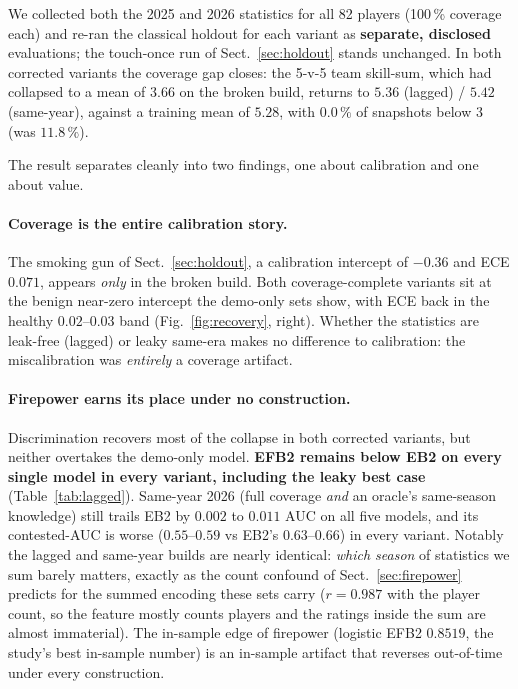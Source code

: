 \documentclass[11pt,a4paper]{article}
\begin{document}
We collected both the 2025 and 2026 statistics for all 82 players (100\,\% coverage each) and re-ran
the classical holdout for each variant as \textbf{separate, disclosed} evaluations; the touch-once run
of Sect.~\ref{sec:holdout} stands unchanged. In both corrected variants the coverage gap closes: the
5-v-5 team skill-sum, which had collapsed to a mean of $3.66$ on the broken build, returns to $5.36$
(lagged) / $5.42$ (same-year), against a training mean of $5.28$, with $0.0\,\%$ of snapshots below
$3$ (was $11.8\,\%$).

The result separates cleanly into two findings, one about calibration and one about value.

\paragraph{Coverage is the entire calibration story.}
The smoking gun of Sect.~\ref{sec:holdout}, a calibration intercept of $-0.36$ and ECE $0.071$, appears \emph{only} in the broken build. Both coverage-complete variants sit at the benign near-zero
intercept the demo-only sets show, with ECE back in the healthy $0.02$--$0.03$ band
(Fig.~\ref{fig:recovery}, right). Whether the statistics are leak-free (lagged) or leaky same-era makes
no difference to calibration: the miscalibration was \emph{entirely} a coverage artifact.

\paragraph{Firepower earns its place under no construction.}
Discrimination recovers most of the collapse in both corrected variants, but neither overtakes the
demo-only model. \textbf{EFB2 remains below EB2 on every single model in every variant, including the
leaky best case} (Table~\ref{tab:lagged}). Same-year 2026 (full coverage \emph{and} an oracle's
same-season knowledge) still trails EB2 by $0.002$ to $0.011$ AUC on all five models, and its
contested-AUC is worse ($0.55$--$0.59$ vs EB2's $0.63$--$0.66$) in every variant. Notably the lagged
and same-year builds are nearly identical: \emph{which season} of statistics we sum barely matters,
exactly as the count confound of Sect.~\ref{sec:firepower} predicts for the summed encoding these
sets carry ($r = 0.987$ with the player count, so the feature mostly counts players and the ratings
inside the sum are almost immaterial). The
in-sample edge of firepower (logistic EFB2 $0.8519$, the study's best in-sample number) is an in-sample
artifact that reverses out-of-time under every construction.
\end{document}
